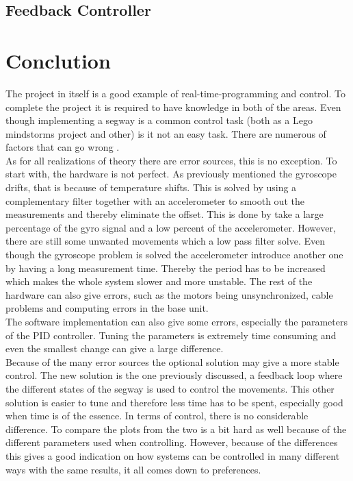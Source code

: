 \documentclass[a4paper]{article}
\begin{document}
\subsection{Feedback Controller}

\section{Conclution}
The project in itself is a good example of real-time-programming and control. To complete the project it is required to have knowledge in both of the areas. Even though implementing a segway is a common control task (both as a Lego mindstorms project and other) is it not an easy task. There are numerous of factors that can go wrong .\\

As for all realizations of theory there are error sources, this is no exception. To start with, the hardware is not perfect. As previously mentioned the gyroscope drifts, that is because of temperature shifts. This is solved by using a complementary filter together with an accelerometer to smooth out the measurements and thereby eliminate the offset. This is done by take a large percentage of the gyro signal and a low percent of the accelerometer. However, there are still some unwanted movements which a low pass filter solve. Even though the gyroscope problem is solved the accelerometer introduce another one by having a long measurement time. Thereby the period has to be increased which makes the whole system slower and more unstable. The rest of the hardware can also give errors, such as the motors being unsynchronized, cable problems and computing errors in the base unit.\\

The software implementation can also give some errors, especially the parameters of the PID controller. Tuning the parameters is extremely time consuming and even the smallest change can give a large difference.\\

Because of the many error sources the optional solution may give a more stable control. The new solution is the one previously discussed, a feedback loop where the different states of the segway is used to control the movements. This other solution is easier to tune and therefore less time has to be spent, especially good when time is of the essence. In terms of control, there is no considerable difference. To compare the plots from the two is a bit hard as well because of the different parameters used when controlling. However, because of the differences this gives a good indication on how systems can be controlled in many different ways with the same results, it all comes down to preferences. \\
\end{document}
